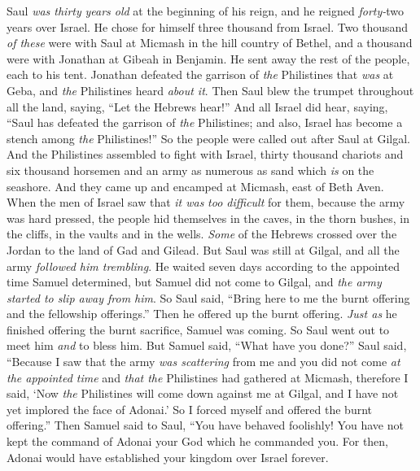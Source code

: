 \begin{biblechapter} %
 Saul \textit{was thirty} \textit{years old} at the beginning of his reign, and he reigned \textit{forty-}two years over Israel.
\verse He chose for himself three thousand from Israel. Two thousand \textit{of these} were with Saul at Micmash in the hill country of Bethel, and a thousand were with Jonathan at Gibeah in Benjamin. He sent away the rest of the people, each to his tent.
\verse Jonathan defeated the garrison of \textit{the} Philistines that \textit{was} at Geba, and \textit{the} Philistines heard \textit{about it}. Then Saul blew the trumpet throughout all the land, saying, “Let the Hebrews hear!”
\verse And all Israel did hear, saying, “Saul has defeated the garrison of \textit{the} Philistines; and also, Israel has become a stench among \textit{the} Philistines!” So the people were called out after Saul at Gilgal.
 And the Philistines assembled to fight with Israel, thirty thousand chariots and six thousand horsemen and an army as numerous as sand which \textit{is} on the seashore. And they came up and encamped at Micmash, east of Beth Aven.
\verse When the men of Israel saw that \textit{it was} \textit{too difficult} for them, because the army was hard pressed, the people hid themselves in the caves, in the thorn bushes, in the cliffs, in the vaults and in the wells.
\verse \textit{Some} of the Hebrews crossed over the Jordan to the land of Gad and Gilead. But Saul was still at Gilgal, and all the army \textit{followed him trembling}.
\verse He waited seven days according to the appointed time Samuel determined, but Samuel did not come to Gilgal, and \textit{the army started to slip away from him}.
\verse So Saul said, “Bring here to me the burnt offering and the fellowship offerings.” Then he offered up the burnt offering.
\verse \textit{Just as} he finished offering the burnt sacrifice, Samuel was coming. So Saul went out to meet him \textit{and} to bless him.
\verse But Samuel said, “What have you done?” Saul said, “Because I saw that the army \textit{was scattering} from me and you did not come \textit{at the appointed time} and \textit{that the} Philistines had gathered at Micmash,
\verse therefore I said, ‘Now \textit{the} Philistines will come down against me at Gilgal, and I have not yet implored the face of Adonai.’ So I forced myself and offered the burnt offering.”
\verse Then Samuel said to Saul, “You have behaved foolishly! You have not kept the command of Adonai your God which he commanded you. For then, Adonai would have established your kingdom over Israel forever.

\end{biblechapter}
